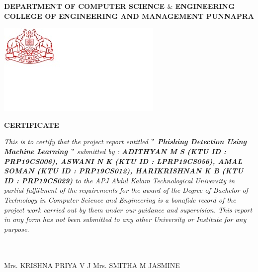 



\begin{titlepage}
	\begin{center}
		\textbf{DEPARTMENT OF COMPUTER SCIENCE $\&$ ENGINEERING}\\[0.5cm]
		\textbf{ COLLEGE OF ENGINEERING AND MANAGEMENT PUNNAPRA}\\
		\vspace{1cm}
			\begin{center}
	\hspace{5cm}
	    	\includegraphics[]{am2.jpg}
	\end{center}
		\vspace{1cm}
		\textbf{CERTIFICATE}\\
	\end{center}
	\textit{\emph{\hspace{1cm} This is to certify that the project report entitled {\textbf{$"$ Phishing Detection Using Machine Learning $"$}} submitted  by :  \textbf{ADITHYAN M S (KTU ID : PRP19CS006), ASWANI N K (KTU ID : LPRP19CS056), AMAL SOMAN (KTU ID : PRP19CS012), HARIKRISHNAN K B (KTU ID : PRP19CS029)} to the APJ Abdul Kalam Technological University in partial fulfillment of the requirements for the award of the Degree of Bachelor of Technology in Computer Science and Engineering is a bonafide record of the project work carried out by them under our guidance and supervision. This report in any form  has not been submitted to any other University or Institute for any purpose. }}\\\\\\
		\begin{FlushLeft}
			\begin{footnotesize}
				Mrs. KRISHNA PRIYA V J\hspace{0.45cm}
				Mrs. SMITHA M JASMINE\hspace{0.45cm}

\end{footnotesize}
\end{FlushLeft}
\end{titlepage}

